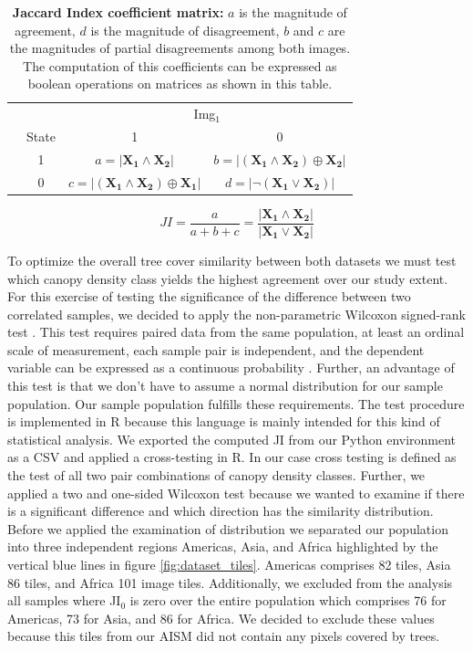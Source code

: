 			\begin{table}[ht]
				\centering
				\caption[Jaccard Index coefficient matrix]{\textbf{Jaccard Index coefficient matrix:} $a$ is the magnitude of agreement, $d$ is the magnitude of disagreement, $b$ and $c$ are the magnitudes of partial disagreements among both images. The computation of this coefficients can be expressed as boolean operations on matrices as shown in this table.}
				\label{tab:jaccard_matrix}
				\begin{tabular}{lccc}
					\hline
					& & \multicolumn{2}{c}{Img$_1$} \\
					& State & 1 & 0 \\\hline
					\multirow{2}{*}{\STAB{\rotatebox[origin=c]{90}{Img$_2$}}} & 1 & $a=|\mathbf{X_1} \land \mathbf{X_2}|$ & $b=|(\mathbf{X_1} \land \mathbf{X_2}) \oplus \mathbf{X_2}| $ \\ 
					& 0 & $c=|(\mathbf{X_1} \land \mathbf{X_2}) \oplus \mathbf{X_1}|$ & $d=|\neg ( \mathbf{X_1} \lor \mathbf{X_2})|$ \\\hline 
				\end{tabular}
			\end{table}
			\begin{equation}
			\label{eq:jaccard_index}
				JI = \frac{a}{a+b+c} = \frac{|\mathbf{X_1} \land \mathbf{X_2}|}{|\mathbf{X_1} \lor \mathbf{X_2}|}
			\end{equation}

			To optimize the overall tree cover similarity between both datasets we must test which canopy density class yields the highest agreement over our study extent. For this exercise of testing the significance of the difference between two correlated samples, we decided to apply the non-parametric Wilcoxon signed-rank test \citep{Wilcoxon1945}. This test requires paired data from the same population, at least an ordinal scale of measurement, each sample pair is independent, and the dependent variable can be expressed as a continuous probability \citep{Lowry2019}. Further, an advantage of this test is that we don't have to assume a normal distribution for our sample population. Our sample population fulfills these requirements. The test procedure is implemented in R because this language is mainly intended for this kind of statistical analysis. We exported the computed \ac{JI} from our Python environment as a \ac{CSV} and applied a cross-testing in R. In our case cross testing is defined as the test of all two pair combinations of canopy density classes. Further, we applied a two and one-sided Wilcoxon test because we wanted to examine if there is a significant difference and which direction has the similarity distribution. Before we applied the examination of distribution we separated our population into three independent regions Americas, Asia, and Africa highlighted by the vertical blue lines in figure \ref{fig:dataset_tiles}. Americas comprises 82 tiles, Asia 86 tiles, and Africa 101 image tiles. Additionally, we excluded from the analysis all samples where JI$_0$ is zero over the entire population which comprises 76 for Americas, 73 for Asia, and 86 for Africa. We decided to exclude these values because this tiles from our \ac{AISM} did not contain any pixels covered by trees.
 
